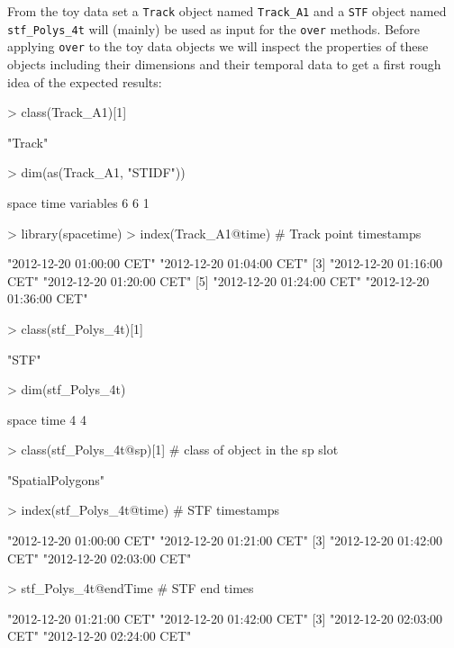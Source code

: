 \documentclass[12pt, oneside, a4paper]{scrbook}
\let\code=\texttt
\begin{document}
From the toy data set a \code{Track} object named \code{Track\_A1} and a \code{STF} object named \code{stf\_Polys\_4t} will (mainly) be used as input for the \code{over} methods.
Before applying \code{over} to the toy data objects we will inspect the properties of these objects including their dimensions and their temporal data to get a first rough idea of the expected results:

\begin{small}
\begin{Schunk}
\begin{Sinput}
> class(Track_A1)[1]
\end{Sinput}
\begin{Soutput}
[1] "Track"
\end{Soutput}
\begin{Sinput}
> dim(as(Track_A1, "STIDF"))
\end{Sinput}
\begin{Soutput}
    space      time variables 
        6         6         1 
\end{Soutput}
\begin{Sinput}
> library(spacetime)
> index(Track_A1@time) # Track point timestamps
\end{Sinput}
\begin{Soutput}
[1] "2012-12-20 01:00:00 CET" "2012-12-20 01:04:00 CET"
[3] "2012-12-20 01:16:00 CET" "2012-12-20 01:20:00 CET"
[5] "2012-12-20 01:24:00 CET" "2012-12-20 01:36:00 CET"
\end{Soutput}
\begin{Sinput}
> class(stf_Polys_4t)[1]
\end{Sinput}
\begin{Soutput}
[1] "STF"
\end{Soutput}
\begin{Sinput}
> dim(stf_Polys_4t)
\end{Sinput}
\begin{Soutput}
space  time 
    4     4 
\end{Soutput}
\begin{Sinput}
> class(stf_Polys_4t@sp)[1] # class of object in the sp slot
\end{Sinput}
\begin{Soutput}
[1] "SpatialPolygons"
\end{Soutput}
\begin{Sinput}
> index(stf_Polys_4t@time) # STF timestamps
\end{Sinput}
\begin{Soutput}
[1] "2012-12-20 01:00:00 CET" "2012-12-20 01:21:00 CET"
[3] "2012-12-20 01:42:00 CET" "2012-12-20 02:03:00 CET"
\end{Soutput}
\begin{Sinput}
> stf_Polys_4t@endTime # STF end times
\end{Sinput}
\begin{Soutput}
[1] "2012-12-20 01:21:00 CET" "2012-12-20 01:42:00 CET"
[3] "2012-12-20 02:03:00 CET" "2012-12-20 02:24:00 CET"
\end{Soutput}
\end{Schunk}
\end{small}
\end{document}
